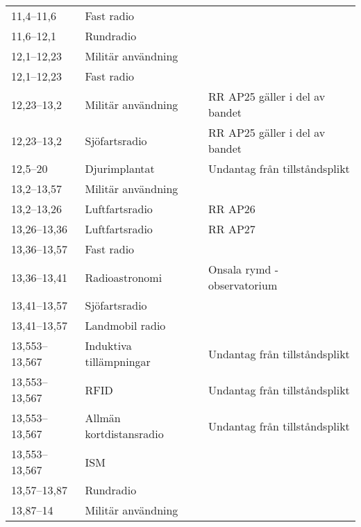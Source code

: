 \begin{landscape}
\begin{longtable}{lll}
11,4--11,6        & Fast radio                       &                                 \\
11,6--12,1        & Rundradio                        &                                 \\
12,1--12,23       & Militär användning               &                                 \\
12,1--12,23       & Fast radio                       &                                 \\
12,23--13,2       & Militär användning               & RR AP25 gäller i del av bandet  \\
12,23--13,2       & Sjöfartsradio                    & RR AP25 gäller i del av bandet  \\
12,5--20          & Djurimplantat                    & Undantag från tillståndsplikt   \\
13,2--13,57       & Militär användning               &                                 \\
13,2--13,26       & Luftfartsradio                   & RR AP26                         \\
13,26--13,36      & Luftfartsradio                   & RR AP27                         \\
13,36--13,57      & Fast radio                       &                                 \\
13,36--13,41      & Radioastronomi                   & Onsala rymd - observatorium     \\
13,41--13,57      & Sjöfartsradio                    &                                 \\
13,41--13,57      & Landmobil radio                  &                                 \\
13,553--13,567    & Induktiva tillämpningar          & Undantag från tillståndsplikt   \\
13,553--13,567    & RFID                             & Undantag från tillståndsplikt   \\
13,553--13,567    & Allmän kortdistansradio          & Undantag från tillståndsplikt   \\
13,553--13,567    & ISM                              &                                 \\
13,57--13,87      & Rundradio                        &                                 \\
13,87--14         & Militär användning               &                                 \\

\end{longtable}
\end{landscape}
